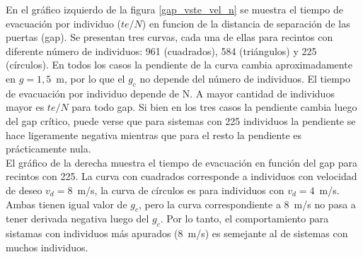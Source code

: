 En el gráfico izquierdo de la figura \ref{gap_vste_vel_n} se muestra el tiempo de evacuación por individuo ($te/N$) en funcion de la distancia de separación de las puertas (gap). Se presentan tres curvas, cada una de ellas para recintos con diferente número de individuos: 961 (cuadrados), 584 (triángulos) y 225 (círculos). En todos los casos la pendiente de la curva cambia aproximadamente en $g=1,5$~m, por lo que el $g_c$ no depende del número de individuos. 
El tiempo de evacuación por individuo depende de N. A mayor cantidad de individuos mayor es $te/N$ para todo gap. 
Si bien en los tres casos la pendiente cambia luego del gap crítico, puede verse que para sistemas con 225 individuos la pendiente se hace ligeramente negativa mientras que para el resto la pendiente es prácticamente nula. \\
El gráfico de la derecha muestra el tiempo de evacuación en función del gap para recintos con 225. La curva con cuadrados corresponde a individuos con velocidad de deseo $v_d=8$~m/s, la curva de círculos es para individuos con $v_d=4$~m/s. Ambas tienen igual valor de $g_c$, pero la curva correspondiente a 8~m/s no pasa a tener derivada negativa luego del $g_c$. Por lo tanto, el comportamiento para sistamas con individuos más apurados (8~m/s) es semejante al de sistemas con muchos individuos. 

